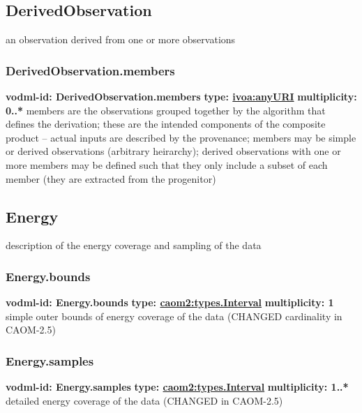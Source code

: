   \subsection{DerivedObservation}
  \label{sect:DerivedObservation}
    an observation derived from one or more observations

    \subsubsection{DerivedObservation.members}
      \textbf{vodml-id: DerivedObservation.members} \newline
      \textbf{type: \hyperref[sect:ivoa]{ivoa:anyURI}} \newline
      \textbf{multiplicity: 0..*} \newline
      members are the observations grouped together by the algorithm that defines the derivation; these are the intended components of the composite product -- actual inputs are described by the provenance; members may be simple or derived observations (arbitrary heirarchy); derived observations with one or more members may be defined such that they only include a subset of each member (they are extracted from the progenitor)

  \subsection{Energy}
  \label{sect:Energy}
    description of the energy coverage and sampling of the data

    \subsubsection{Energy.bounds}
      \textbf{vodml-id: Energy.bounds} \newline
      \textbf{type: \hyperref[sect:types.Interval]{caom2:types.Interval}} \newline
      \textbf{multiplicity: 1} \newline
      simple outer bounds of energy coverage of the data (CHANGED cardinality in CAOM-2.5)

    \subsubsection{Energy.samples}
      \textbf{vodml-id: Energy.samples} \newline
      \textbf{type: \hyperref[sect:types.Interval]{caom2:types.Interval}} \newline
      \textbf{multiplicity: 1..*} \newline
      detailed energy coverage of the data (CHANGED in CAOM-2.5)

